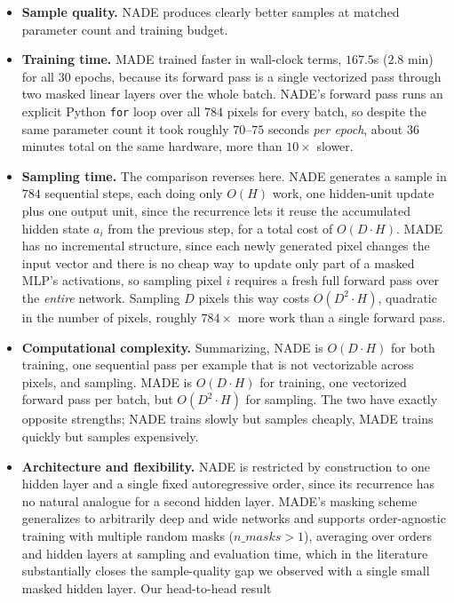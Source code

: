 \documentclass[11pt]{article}
\begin{document}
\begin{itemize}
  \item \textbf{Sample quality.} NADE produces clearly better samples at matched
  parameter count and training budget.
  \item \textbf{Training time.} MADE trained faster in wall-clock terms,
  $167.5$s ($2.8$ min) for all $30$ epochs, because its forward pass is a single
  vectorized pass through two masked linear layers over the whole batch. NADE's
  forward pass runs an explicit Python \texttt{for} loop over all $784$ pixels
  for every batch, so despite the same parameter count it took roughly
  $70$--$75$ seconds \emph{per epoch}, about $36$ minutes total on the same
  hardware, more than $10\times$ slower.
  \item \textbf{Sampling time.} The comparison reverses here. NADE generates a
  sample in $784$ sequential steps, each doing only $O(H)$ work, one hidden-unit
  update plus one output unit, since the recurrence lets it reuse the
  accumulated hidden state $a_i$ from the previous step, for a total cost of
  $O(D\cdot H)$. MADE has no incremental structure, since each newly generated
  pixel changes the input vector and there is no cheap way to update only part
  of a masked MLP's activations, so sampling pixel $i$ requires a fresh full
  forward pass over the \emph{entire} network. Sampling $D$ pixels this way
  costs $O(D^2\cdot H)$, quadratic in the number of pixels, roughly $784\times$
  more work than a single forward pass.
  \item \textbf{Computational complexity.} Summarizing, NADE is $O(D\cdot H)$
  for both training, one sequential pass per example that is not vectorizable
  across pixels, and sampling. MADE is $O(D\cdot H)$ for training, one
  vectorized forward pass per batch, but $O(D^2\cdot H)$ for sampling. The two
  have exactly opposite strengths; NADE trains slowly but samples cheaply, MADE
  trains quickly but samples expensively.
  \item \textbf{Architecture and flexibility.} NADE is restricted by
  construction to one hidden layer and a single fixed autoregressive order,
  since its recurrence has no natural analogue for a second hidden layer.
  MADE's masking scheme generalizes to arbitrarily deep and wide networks and
  supports order-agnostic training with multiple random masks ($n\_masks>1$),
  averaging over orders and hidden layers at sampling and evaluation time,
  which in the literature substantially closes the sample-quality gap we
  observed with a single small masked hidden layer. Our head-to-head result

\end{itemize}
\end{document}
